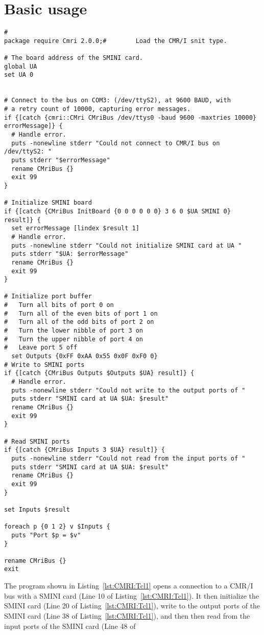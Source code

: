 \section{Basic usage}
\begin{lstlisting}[caption={Using the CMR/I from Tcl},
		   label=lst:CMRI:Tcl1]
#
package require Cmri 2.0.0;#		Load the CMR/I snit type.

# The board address of the SMINI card.
global UA
set UA 0


# Connect to the bus on COM3: (/dev/ttyS2), at 9600 BAUD, with
# a retry count of 10000, capturing error messages.
if {[catch {cmri::CMri CMriBus /dev/ttys0 -baud 9600 -maxtries 10000} errorMessage]} {
  # Handle error.
  puts -nonewline stderr "Could not connect to CMR/I bus on /dev/ttyS2: "
  puts stderr "$errorMessage"
  rename CMriBus {}
  exit 99
}

# Initialize SMINI board
if {[catch {CMriBus InitBoard {0 0 0 0 0 0} 3 6 0 $UA SMINI 0} result]} {
  set errorMessage [lindex $result 1]
  # Handle error.
  puts -nonewline stderr "Could not initialize SMINI card at UA "
  puts stderr "$UA: $errorMessage"
  rename CMriBus {}
  exit 99
}

# Initialize port buffer
#	Turn all bits of port 0 on 
#	Turn all of the even bits of port 1 on
#	Turn all of the odd bits of port 2 on
#	Turn the lower nibble of port 3 on
#	Turn the upper nibble of port 4 on
#	Leave port 5 off
  set Outputs {0xFF 0xAA 0x55 0x0F 0xF0 0}
# Write to SMINI ports
if {[catch {CMriBus Outputs $Outputs $UA} result]} {
  # Handle error.
  puts -nonewline stderr "Could not write to the output ports of "
  puts stderr "SMINI card at UA $UA: $result"
  rename CMriBus {}
  exit 99
}

# Read SMINI ports
if {[catch {CMriBus Inputs 3 $UA} result]} {
  puts -nonewline stderr "Could not read from the input ports of "
  puts stderr "SMINI card at UA $UA: $result"
  rename CMriBus {}
  exit 99
}

set Inputs $result

foreach p {0 1 2} v $Inputs {
  puts "Port $p = $v"
}

rename CMriBus {} 
exit 
\end{lstlisting} 
The program shown in Listing~\ref{lst:CMRI:Tcl1} opens a connection to
a CMR/I bus with a SMINI card (Line 10 of Listing~\ref{lst:CMRI:Tcl1}).
It then initialize the SMINI card (Line 20 of
Listing~\ref{lst:CMRI:Tcl1}), write to the output ports of the SMINI
card (Line 38 of Listing~\ref{lst:CMRI:Tcl1}), and then then read from
the input ports of the SMINI card (Line 48 of
